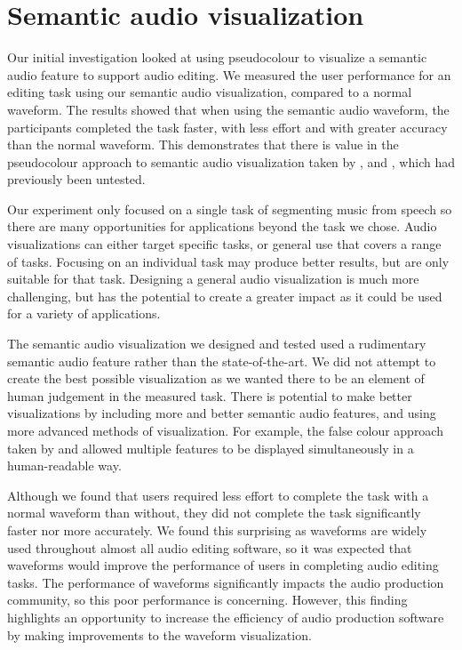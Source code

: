 \section{Semantic audio visualization}

Our initial investigation looked at using pseudocolour to visualize a semantic audio feature to support audio editing.
We measured the user performance for an editing task using our semantic audio visualization, compared to a normal
waveform.  The results showed that when using the semantic audio waveform, the participants completed the task faster,
with less effort and with greater accuracy than the normal waveform. This demonstrates that there is value in the
pseudocolour approach to semantic audio visualization taken by \citet{Rice2005}, \citet{Akkermans2011} and
\citet{Loviscach2011a}, which had previously been untested.

Our experiment only focused on a single task of segmenting music from speech so there are many opportunities for
applications beyond the task we chose. Audio visualizations can either target specific tasks, or
general use that covers a range of tasks. Focusing on an individual task may produce better results, but are only suitable
for that task.  Designing a general audio visualization is much more challenging, but has the potential to create a 
greater impact as it could be used for a variety of applications.

The semantic audio visualization we designed and tested used a rudimentary semantic audio feature rather than the
state-of-the-art.  We did not attempt to create the best possible visualization as we wanted there to be an element of
human judgement in the measured task. There is potential to make better visualizations by including more and
better semantic audio features, and using more advanced methods of visualization. For example, the false colour
approach taken by \citet{Tzanetakis2000} and \citet{Mason2007} allowed multiple features to be displayed simultaneously
in a human-readable way.

Although we found that users required less effort to complete the task with a normal waveform than without, they did
not complete the task significantly faster nor more accurately. We found this surprising as waveforms are widely used
throughout almost all audio editing software, so it was expected that waveforms would improve the performance of users in
completing audio editing tasks. The performance of waveforms significantly impacts the audio production community, so
this poor performance is concerning. However, this finding highlights an opportunity to increase the efficiency of
audio production software by making improvements to the waveform visualization.

